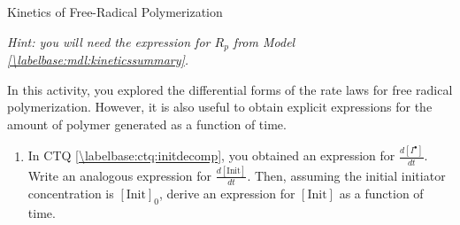 \begin{activity}{Kinetics of Free-Radical Polymerization}
\begin{exercises}
\begin{enumerate}
				\emph{Hint: you will need the expression for $R_p$ from Model \ref{\labelbase:mdl:kineticssummary}.}
			
				\begin{solution}\end{solution}	%
				\begin{solution}\end{solution}
				
		\end{enumerate}
		
	\exercise In this activity, you explored the differential forms of the rate laws for free radical polymerization.   However, it is also useful to obtain explicit expressions for the amount of polymer generated as a function of time.
	
		\begin{enumerate}
			\item In CTQ \ref{\labelbase:ctq:initdecomp}, you obtained an expression for $\frac{d[I^\bullet]}{dt}$.  Write an analogous expression for $\frac{d[\text{Init}]}{dt}$.  Then, assuming the initial initiator concentration is $[\text{Init}]_0$, derive an expression for $[\text{Init}]$ as a function of time.
			

\end{enumerate}
\end{exercises}
\end{activity}
